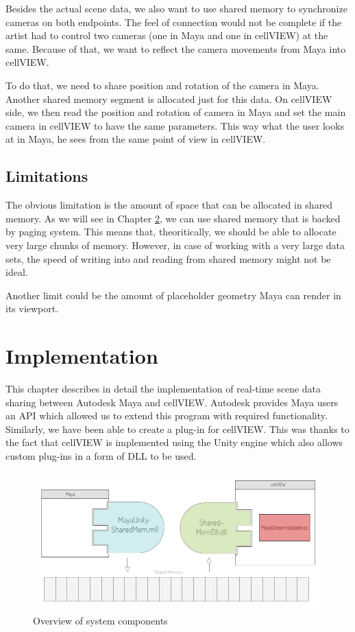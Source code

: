 \documentclass[
  digital, %
  table,   %
  nolof,     %
  nolot,     %
  oneside,
]{fithesis3}
\begin{document}
Besides the actual scene data, we also want to use shared memory to synchronize cameras on both endpoints. The feel of connection would not be complete if the artist had to control two cameras (one in Maya and one in cellVIEW) at the same. Because of that, we want to reflect the camera movements from Maya into cellVIEW.

To do that, we need to share position and rotation of the camera in Maya. Another shared memory segment is allocated just for this data. On cellVIEW side, we then read the position and rotation of camera in Maya and set the main camera in cellVIEW to have the same parameters. This way what the user looks at in Maya, he sees from the same point of view in cellVIEW.

\section{Limitations}
The obvious limitation is the amount of space that can be allocated in shared memory. As we will see in Chapter \ref{chap:implementation}, we can use shared memory that is backed by paging system. This means that, theoritically, we should be able to allocate very large chunks of memory. However, in case of working with a very large data sets, the speed of writing into and reading from shared memory might not be ideal.

Another limit could be the amount of placeholder geometry Maya can render in its viewport. 


\chapter{Implementation}
\label{chap:implementation}
This chapter describes in detail the implementation of real-time scene data sharing between Autodesk Maya and cellVIEW. Autodesk provides Maya users an API which allowed us to extend this program with required functionality. Similarly, we have been able to create a plug-in for cellVIEW. This was thanks to the fact that cellVIEW is implemented using the Unity engine which also allows custom plug-ins in a form of DLL to be used.

\begin{figure}
  \begin{center}
    \includegraphics[scale=0.8]{images/system-overview.pdf}
  \end{center}
  \caption{Overview of system components}
  \label{fig:system-overview}
\end{figure}
\end{document}
